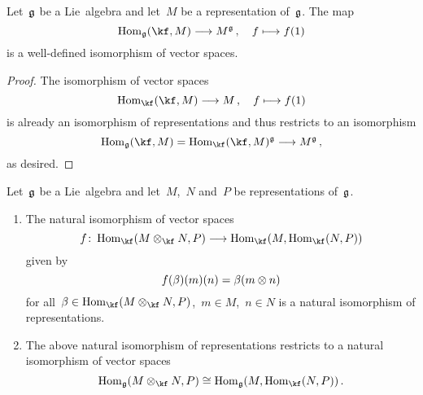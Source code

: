 \begin{corollary}
	\label{invariants via internal hom}
	Let~$\mathfrak{g}$ be a Lie~algebra and let~$M$ be a representation of~$\mathfrak{g}$.
	The map
	\[
		\Hom_{\glie}(\kf, M)
		\to
		M^{\glie} \,,
		\quad
		f
		\mapsto
		f(1)
	\]
	is a well-defined isomorphism of vector spaces.
\end{corollary}


\begin{proof}
	The isomorphism of vector spaces
	\[
		\Hom_{\kf}(\kf, M)
		\to
		M \,,
		\quad
		f
		\mapsto
		f(1)
	\]
	is already an isomorphism of representations and thus restricts to an isomorphism
	\[
		\Hom_{\glie}(\kf, M)
		=
		\Hom_{\kf}(\kf, M)^{\glie}
		\to
		M^{\glie} \,,
	\]
	as desired.
\end{proof}


\begin{proposition}
	\label{checking enriched tensor hom adjunction}
	Let~$\mathfrak{g}$ be a Lie~algebra and let~$M$,~$N$ and~$P$ be representations of~$\mathfrak{g}$.
	\begin{enumerate}
		\item
			The natural isomorphism of vector spaces
			\[
				f
				\colon
				\Hom_{\kf}( M \tensor_{\kf} N, P )
				\to
				\Hom_{\kf}( M, \Hom_{\kf}(N, P) )
			\]
			given by
			\[
				f(\beta)(m)(n)
				=
				\beta(m \otimes n)
			\]
			for all~$\beta \in \Hom_{\kf}( M \tensor_{\kf} N, P )$,~$m \in M$,~$n \in N$ is a natural isomorphism of representations.
		\item
			The above natural isomorphism of representations restricts to a natural isomorphism of vector spaces
			\[
				\Hom_{\glie}( M \tensor_{\kf} N, P )
				\cong
				\Hom_{\glie}( M, \Hom_{\kf}(N, P) ) \,.
			\]
	\end{enumerate}
\end{proposition}



